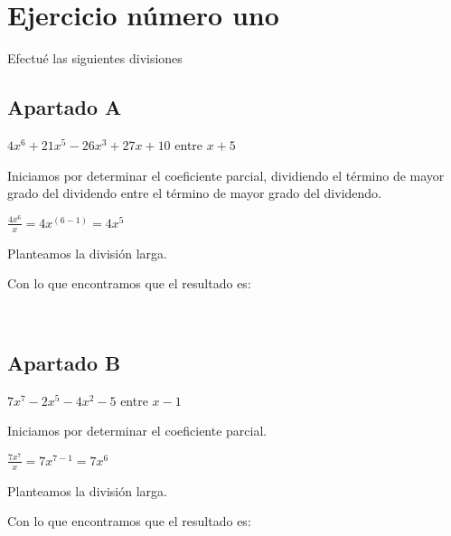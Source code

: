 \documentclass[letterpaper, 10pt]{article}
\begin{document}
    

    \newpage
    \tableofcontents

    \as

    \newpage
    \section{Ejercicio número uno}
    Efectué las siguientes divisiones
        \subsection{\textbf{Apartado A}}
                \begin{center} $4x^6+21x^5-26x^3+27x+10$ entre $x+5$ \end{center}
                Iniciamos por determinar el coeficiente parcial, dividiendo el término de mayor grado del dividendo entre el término de mayor grado del dividendo.
                \begin{center} $\frac{4x^6}{x} = 4x^{(6-1)} = 4x^5$ \end{center}
                Planteamos la división larga.
                \begin{center}  \end{center}
                Con lo que encontramos que el resultado es:
                \begin{center}  \\  \end{center}

            \vspace{3mm}
            \subsection{\textbf{Apartado B}}
            \begin{center} $7x^7-2x^5-4x^2-5$ entre $x-1$ \end{center}
                Iniciamos por determinar el coeficiente parcial.
                \begin{center} $\frac{7x^7}{x}=7x^{7-1}=7x^6$ \end{center}
                Planteamos la división larga.
                \begin{center}  \end{center}
                Con lo que encontramos que el resultado es:
                \begin{center}  \\  \end{center}
    
\end{document}
